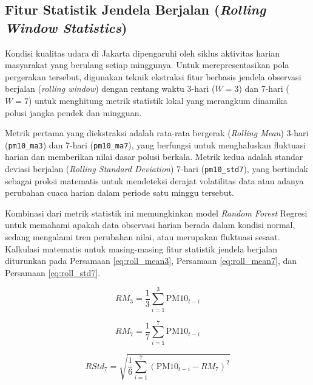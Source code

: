 \subsection{Fitur Statistik Jendela Berjalan (\textit{Rolling Window Statistics})}

Kondisi kualitas udara di Jakarta dipengaruhi oleh siklus aktivitas harian masyarakat yang berulang setiap minggunya. Untuk merepresentasikan pola pergerakan tersebut, digunakan teknik ekstraksi fitur berbasis jendela observasi berjalan (\textit{rolling window}) dengan rentang waktu 3-hari ($W=3$) dan 7-hari ($W=7$) untuk menghitung metrik statistik lokal yang merangkum dinamika polusi jangka pendek dan mingguan.

Metrik pertama yang diekstraksi adalah rata-rata bergerak (\textit{Rolling Mean}) 3-hari (\texttt{pm10\_ma3}) dan 7-hari (\texttt{pm10\_ma7}), yang berfungsi untuk menghaluskan fluktuasi harian dan memberikan nilai dasar polusi berkala. Metrik kedua adalah standar deviasi berjalan (\textit{Rolling Standard Deviation}) 7-hari (\texttt{pm10\_std7}), yang bertindak sebagai proksi matematis untuk mendeteksi derajat volatilitas data atau adanya perubahan cuaca harian dalam periode satu minggu tersebut.

Kombinasi dari metrik statistik ini memungkinkan model \textit{Random Forest} Regresi untuk memahami apakah data observasi harian berada dalam kondisi normal, sedang mengalami tren perubahan nilai, atau merupakan fluktuasi sesaat. Kalkulasi matematis untuk masing-masing fitur statistik jendela berjalan diturunkan pada Persamaan \ref{eq:roll_mean3}, Persamaan \ref{eq:roll_mean7}, dan Persamaan \ref{eq:roll_std7}.

\begin{equation}
    RM_{3} = \frac{1}{3} \sum_{i=1}^{3} \text{PM10}_{t-i}
    \label{eq:roll_mean3}
\end{equation}

\begin{equation}
    RM_{7} = \frac{1}{7} \sum_{i=1}^{7} \text{PM10}_{t-i}
    \label{eq:roll_mean7}
\end{equation}

\begin{equation}
    RStd_{7} = \sqrt{\frac{1}{6} \sum_{i=1}^{7} (\text{PM10}_{t-i} - RM_{7})^2}
    \label{eq:roll_std7}
\end{equation}

